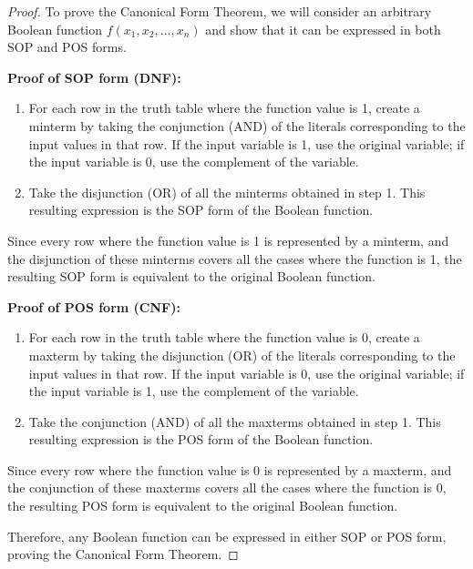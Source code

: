         \begin{proof}
        To prove the Canonical Form Theorem, we will consider an arbitrary Boolean function $f(x_1, x_2, \ldots, x_n)$ and show that it can be expressed in both SOP and POS forms.
        
        \textbf{Proof of SOP form (DNF):}
        \begin{enumerate}
        \item For each row in the truth table where the function value is 1, create a minterm by taking the conjunction (AND) of the literals corresponding to the input values in that row. If the input variable is 1, use the original variable; if the input variable is 0, use the complement of the variable.
        \item Take the disjunction (OR) of all the minterms obtained in step 1. This resulting expression is the SOP form of the Boolean function.
        \end{enumerate}
        
        Since every row where the function value is 1 is represented by a minterm, and the disjunction of these minterms covers all the cases where the function is 1, the resulting SOP form is equivalent to the original Boolean function.
        
        \textbf{Proof of POS form (CNF):}
        \begin{enumerate}
        \item For each row in the truth table where the function value is 0, create a maxterm by taking the disjunction (OR) of the literals corresponding to the input values in that row. If the input variable is 0, use the original variable; if the input variable is 1, use the complement of the variable.
        \item Take the conjunction (AND) of all the maxterms obtained in step 1. This resulting expression is the POS form of the Boolean function.
        \end{enumerate}
        
        Since every row where the function value is 0 is represented by a maxterm, and the conjunction of these maxterms covers all the cases where the function is 0, the resulting POS form is equivalent to the original Boolean function.
        
        Therefore, any Boolean function can be expressed in either SOP or POS form, proving the Canonical Form Theorem.
        \end{proof}
